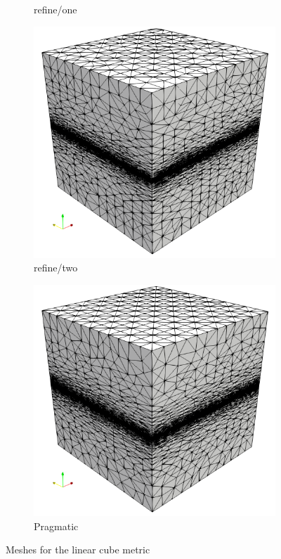 \documentclass[3p,times,procedia,number]{elsarticle}
\begin{document}
\begin{figure}
\begin{subfigure}{.24\textwidth}
\caption{refine/one}
\end{subfigure}
\begin{subfigure}{.24\textwidth}
\centering
\includegraphics[width=\textwidth]{refine-two-cube-linear.png}
\caption{refine/two}
\end{subfigure}
\begin{subfigure}{.24\textwidth}
\centering
\includegraphics[width=\textwidth]{pragmatic-cube-linear.png}
\caption{Pragmatic}
\end{subfigure}
\caption{Meshes for the linear cube metric}
\label{fig:cube-linear-meshes}
\end{figure}
\end{document}
